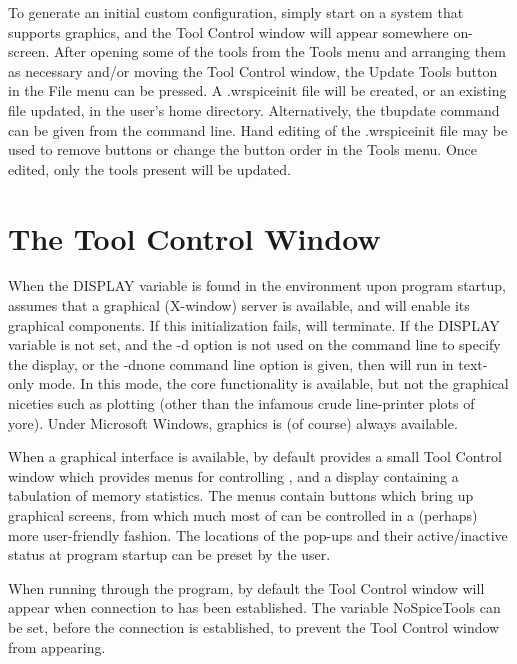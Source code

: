 To generate an initial custom configuration, simply start {\WRspice}
on a system that supports graphics, and the {\cb Tool Control} window
will appear somewhere on-screen.  After opening some of the tools from
the {\cb Tools} menu and arranging them as necessary and/or moving the
{\cb Tool Control} window, the {\cb Update Tools} button in the {\cb
File} menu can be pressed.  A {\vt .wrspiceinit} file will be created,
or an existing file updated, in the user's home directory. 
Alternatively, the {\cb tbupdate} command can be given from the
command line.  Hand editing of the {\vt .wrspiceinit} file may be used
to remove buttons or change the button order in the {\cb Tools} menu. 
Once edited, only the tools present will be updated.


\section{The Tool Control Window}
\label{tcwin}


When the {\et DISPLAY} variable is found in the environment upon
program startup, {\WRspice} assumes that a graphical (X-window) server
is available, and will enable its graphical components.  If this
initialization fails, {\WRspice} will terminate.  If the {\et DISPLAY}
variable is not set, and the {\vt -d} option is not used on the
command line to specify the display, or the {\vt -dnone} command line
option is given, then {\WRspice} will run in text-only mode.  In this
mode, the core functionality is available, but not the graphical
niceties such as plotting (other than the infamous crude line-printer
plots of yore).  Under Microsoft Windows, graphics is (of course)
always available.


When a graphical interface is available, {\WRspice} by default
provides a small {\cb Tool Control} window which provides menus for
controlling {\WRspice}, and a display containing a tabulation of
memory statistics.  The menus contain buttons which bring up graphical
screens, from which much most of {\WRspice} can be controlled in a
(perhaps) more user-friendly fashion.  The locations of the pop-ups
and their active/inactive status at program startup can be preset by
the user.

When running {\WRspice} through the {\Xic} program, by default the
{\cb Tool Control} window will appear when connection to {\WRspice}
has been established.  The {\Xic} variable {\et NoSpiceTools} can be
set, before the connection is established, to prevent the {\cb Tool
Control} window from appearing.

